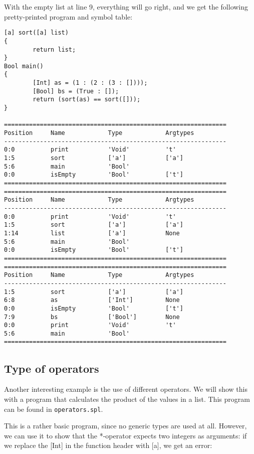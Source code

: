 \documentclass[a4paper]{article}
\begin{document}
With the empty list at line 9, everything will go right, and we get the following pretty-printed program and symbol table: 

\begin{verbatim}
[a] sort([a] list)
{
        return list;
}
Bool main()
{
        [Int] as = (1 : (2 : (3 : [])));
        [Bool] bs = (True : []);
        return (sort(as) == sort([]));
}

==============================================================
Position     Name            Type            Argtypes            
--------------------------------------------------------------
0:0          print           'Void'          't'                 
1:5          sort            ['a']           ['a']               
5:6          main            'Bool'                              
0:0          isEmpty         'Bool'          ['t']               
==============================================================
==============================================================
Position     Name            Type            Argtypes            
--------------------------------------------------------------
0:0          print           'Void'          't'                 
1:5          sort            ['a']           ['a']               
1:14         list            ['a']           None                
5:6          main            'Bool'                              
0:0          isEmpty         'Bool'          ['t']               
==============================================================
==============================================================
Position     Name            Type            Argtypes            
--------------------------------------------------------------
1:5          sort            ['a']           ['a']               
6:8          as              ['Int']         None                
0:0          isEmpty         'Bool'          ['t']               
7:9          bs              ['Bool']        None                
0:0          print           'Void'          't'                 
5:6          main            'Bool'                              
==============================================================
\end{verbatim}

\subsection{Type of operators}

Another interesting example is the use of different operators. We will show this with a program that calculates the product of the values in a list. This program can be found in {\tt operators.spl}.

This is a rather basic program, since no generic types are used at all. However, we can use it to show that the *-operator expects two integers as arguments: if we replace the [Int] in the function header with [a], we get an error: 
\end{document}
